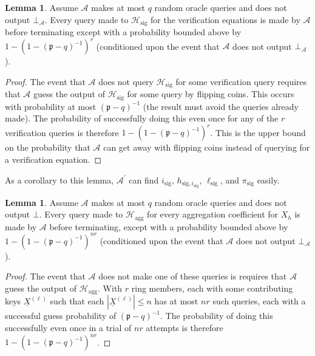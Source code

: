 \documentclass{mrl}
\theoremstyle{definition}
\numberwithin{theorem}{subsection}
\newtheorem{lemma}[theorem]{Lemma}
\newcommand{\adversary}{\mathcal{A}}
\newcommand{\p}{\mathfrak{p}}
\begin{document}


\begin{lemma}
Assume $\adversary$ makes at most $q$ random oracle queries and does not output $\bot_\adversary$. Every query made to $\mathcal{H}_{\text{sig}}$ for the verification equations is made by $\adversary$ before terminating except with a probability bounded above by $1 - (1-(\p - q)^{-1})^{r}$ (conditioned upon the event that $\adversary$ does not output $\bot_\adversary$).
\end{lemma}
\begin{proof}
The event that $\adversary$ does not query $\mathcal{H}_{\text{sig}}$ for some verification query requires that $\adversary$ guess the output of $\mathcal{H}_{\text{sig}}$ for some query by flipping coins. This occurs with probability at most $(\p - q)^{-1}$ (the result must avoid the queries already made). The probability of successfully doing this even once for any of the $r$ verification queries is therefore $1 - (1 - (\p - q)^{-1})^{r}$. This is the upper bound on the probability that $\adversary$ can get away with flipping coins instead of querying for a verification equation.
\end{proof}

As a corollary to this lemma, $\adversary^\prime$ can find $i_{\text{sig}}$, $h_{\text{sig}, i_{\text{sig}}}$, $\ell_{\text{sig}}$, and $\pi_{\text{sig}}$ easily.

\begin{lemma}
Assume $\adversary$ makes at most $q$ random oracle queries and does not output $\bot$. Every query made to $\mathcal{H}_{\text{agg}}$ for every aggregation coefficient for $X_h$ is made by $\adversary$ before terminating, except with a probability bounded above by $1 - (1- (\p - q)^{-1})^{nr}$ (conditioned upon the event that $\adversary$ does not output $\bot_\adversary$).
\end{lemma}
\begin{proof}
The event that $\adversary$ does not make one of these queries is requires that $\adversary$ guess the output of $\mathcal{H}_{\text{agg}}$. With $r$ ring members, each with some contributing keys $\underline{X}^{(\ell)}$ such that each $\left|\underline{X}^{(\ell)}\right| \leq n$ has at most $nr$ such queries, each with a successful guess probability of $(\p - q)^{-1}$. The probability of doing this successfully even once in a trial of $nr$ attempts is therefore $1 - (1- (\p - q)^{-1})^{nr}$.
\end{proof}
\end{document}
